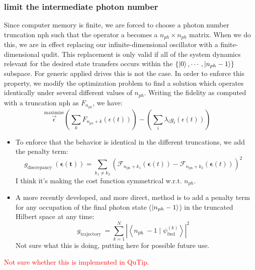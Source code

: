 \documentclass{article}
\begin{document}
\subsubsection{limit the intermediate photon number}
Since computer memory is finite, we are forced to choose a photon number truncation nph such that the operator a becomes a $n_{ph} \times n_{ph}$ matrix. 
When we do this, we are in effect replacing our infinite-dimensional oscillator with a finite-dimensional qudit. 
This replacement is only valid if all of the system dynamics relevant for the desired state transfers occurs within the $\{\ket{0} ,\cdots , \ket{n_{ph} - 1} \}$ subspace. 
For generic applied drives this is not the case. In order to enforce this property, we modify the optimization problem to find a solution which operates identically under several different values of $n_{ph}$.
Writing the fidelity as computed with a truncation nph as $F_{n_{ph}}$, we have:
\begin{equation}
    \stackrel{\text{maximize}}{\vec{\epsilon}} \left( \sum_k F_{n_{ph}+k} (\epsilon(t)) \right) - \left( \sum_i \lambda_i g_i (\epsilon(t)) \right)
\end{equation}

\begin{itemize}
    \item To enforce that the behavior is identical in the different truncations, we add the penalty term: 
        \begin{equation*}
            g_{\text {discrepancy }}(\boldsymbol{\epsilon}(\boldsymbol{t}))=\sum_{k_1 \neq k_2}\left(\mathcal{F}_{n_{\mathrm{ph}}+k_1}(\boldsymbol{\epsilon}(t))-\mathcal{F}_{n_{\mathrm{ph}}+k_2}(\boldsymbol{\epsilon}(t))\right)^2
        \end{equation*}
        I think it's making the cost function symmetrical w.r.t. $n_{ph}$.
    \item A more recently developed, and more direct, method is to add a penalty term for any occupation of the final photon state ($\ket{n_{ph} - 1}$) in the truncated Hilbert space at any time:
        \begin{equation*}
            g_{\text {trajectory }}=\sum_{k=1}^N\left|\left\langle n_{\text {ph }}-1 \mid \psi_{\text {fwd }}^{(k)}\right\rangle\right|^2
        \end{equation*}
        Not sure what this is doing, putting here for possible future use. 
\end{itemize}

\textcolor{red}{Not sure whether this is implemented in QuTip.}
\end{document}
